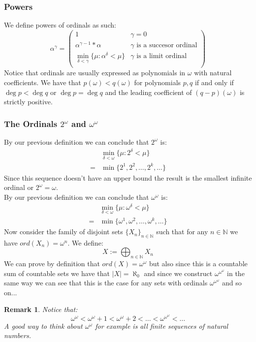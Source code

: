 \documentclass{article}
\newcommand{\N}{\mathbb{N}}
\theoremstyle{plain}
\newtheorem{remark}{Remark}[section]
\begin{document}
	\subsubsection{Powers}
	We define powers of ordinals as such:
	\[
	\alpha^\gamma = 
	\begin{pmatrix}
		1 & \gamma=0\\
		\alpha^{\gamma-1}*\alpha & \gamma\text{ is a succesor ordinal}\\
		\min_{\delta<\gamma}\{\mu:\alpha^\delta<\mu\} & 
		\gamma\text{ is a limit ordinal}\\
	\end{pmatrix}
	\]
	Notice that ordinals are usually expressed as polynomials in $\omega$ with 
	natural coefficients. We have that $p(\omega) < q(\omega)$ for polynomials
	$p,q$ if and only if $\deg p < \deg q$ or $\deg p = \deg q$ and the
	leading coefficient of $(q - p)(\omega)$ is strictly positive.

	\subsubsection{The Ordinals $2^\omega$ and $\omega^\omega$}
	By our previous definition we can conclude that $2^\omega$ is:
	\begin{align*}
		&\min_{\delta<\omega}\{\mu:2^\delta<\mu\} \\
		=&\min\{2^1,2^2,\ldots,2^k,\ldots\}
	\end{align*}
	Since this sequence doesn't have an upper bound the result is the smallest 
	infinite ordinal or $2^\omega=\omega$. \\
	By our previous definition we can conclude that $\omega^\omega$ is:
	\begin{align*}
		&\min_{\delta<\omega}\{\mu:\omega^\delta<\mu\} \\
		=&\min\{\omega^1,\omega^2,\ldots,\omega^k,\ldots\}
	\end{align*}
	Now consider the family of disjoint sets $\{X_n\}_{n \in \N}$ such that 
	for any $n \in \N$ we have $ord(X_n) = \omega^n$. We define:
	\[
		X := \bigoplus_{n \in \N}{X_n}
	\]
	We can prove by definition that $ord(X)=\omega^\omega$ but also since 
	this is a countable sum of countable sets we have that $|X| = \aleph_0$ 
	and since we construct $\omega^{\omega^\omega}$ in the same way we
	can see that this is the case for any sets with ordinals 
	$\omega^{\omega^\omega}$ and so on...
	\begin{remark}
	Notice that:
	\[
		\omega^\omega<\omega^\omega+1<\omega^\omega+2
		<\ldots<
		\omega^{\omega^\omega}<\ldots
	\]
	A good way to think about $\omega^\omega$ for example is all finite 
	sequences of natural numbers.
	\end{remark}
\end{document}
